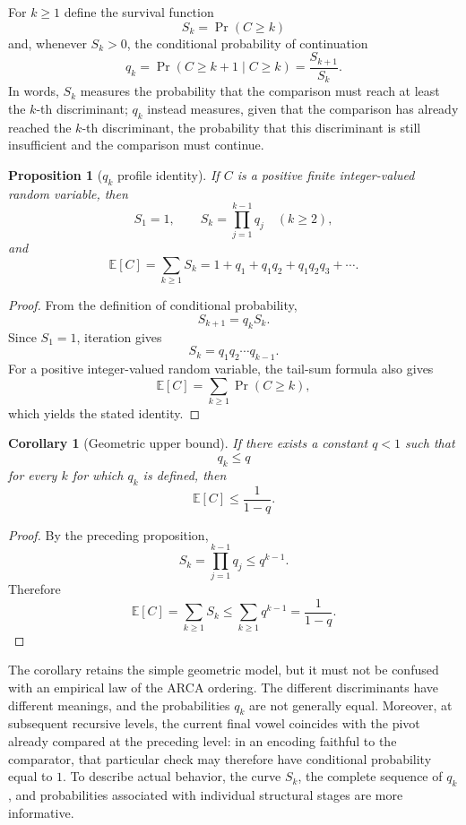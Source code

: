 \documentclass[11pt,a4paper]{article}
\newtheorem{proposition}[theorem]{Proposition}
\newtheorem{corollary}[theorem]{Corollary}
\theoremstyle{definition}
\theoremstyle{remark}
\begin{document}
For $k\geq1$ define the survival function
\[
  S_k=\Pr(C\geq k)
\]
and, whenever $S_k>0$, the conditional probability of continuation
\[
  q_k=\Pr(C\geq k+1\mid C\geq k)
      =\frac{S_{k+1}}{S_k}.
\]
In words, $S_k$ measures the probability that the comparison must reach at least the $k$-th discriminant; $q_k$ instead measures, given that the comparison has already reached the $k$-th discriminant, the probability that this discriminant is still insufficient and the comparison must continue.

\begin{proposition}[$q_k$ profile identity]
If $C$ is a positive finite integer-valued random variable, then
\[
  S_1=1,
  \qquad
  S_k=\prod_{j=1}^{k-1}q_j\quad(k\geq2),
\]
and
\[
  \mathbb{E}[C]
  =\sum_{k\geq1}S_k
  =1+q_1+q_1q_2+q_1q_2q_3+\cdots.
\]
\end{proposition}

\begin{proof}
From the definition of conditional probability,
\[
  S_{k+1}=q_kS_k.
\]
Since $S_1=1$, iteration gives
\[
  S_k=q_1q_2\cdots q_{k-1}.
\]
For a positive integer-valued random variable, the tail-sum formula also gives
\[
  \mathbb{E}[C]=\sum_{k\geq1}\Pr(C\geq k),
\]
which yields the stated identity.
\end{proof}

\begin{corollary}[Geometric upper bound]
If there exists a constant $q<1$ such that
\[
  q_k\leq q
\]
for every $k$ for which $q_k$ is defined, then
\[
  \mathbb{E}[C]\leq\frac{1}{1-q}.
\]
\end{corollary}

\begin{proof}
By the preceding proposition,
\[
  S_k=\prod_{j=1}^{k-1}q_j\leq q^{k-1}.
\]
Therefore
\[
  \mathbb{E}[C]
  =\sum_{k\geq1}S_k
  \leq\sum_{k\geq1}q^{k-1}
  =\frac{1}{1-q}.
\]
\end{proof}

The corollary retains the simple geometric model, but it must not be confused with an empirical law of the ARCA ordering. The different discriminants have different meanings, and the probabilities $q_k$ are not generally equal. Moreover, at subsequent recursive levels, the current final vowel coincides with the pivot already compared at the preceding level: in an encoding faithful to the comparator, that particular check may therefore have conditional probability equal to $1$. To describe actual behavior, the curve $S_k$, the complete sequence of $q_k$, and probabilities associated with individual structural stages are more informative.
\end{document}
